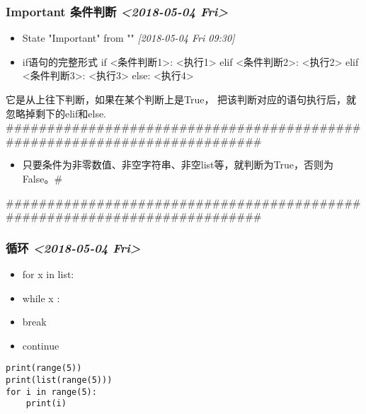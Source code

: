 \documentclass[11pt]{article}
\begin{document}
\subsubsection{{\bfseries\sffamily Important} 条件判断 \textit{<2018-05-04 Fri>}}
\label{sec:org816d645}
\begin{itemize}
\item State "Important"  from ""           \textit{[2018-05-04 Fri 09:30]}
\end{itemize}
\begin{itemize}
\item if语句的完整形式
if <条件判断1>:
    <执行1>
elif <条件判断2>:
    <执行2>
elif <条件判断3>:
    <执行3>
else:
    <执行4>
\end{itemize}
它是从上往下判断，如果在某个判断上是True，
把该判断对应的语句执行后，就忽略掉剩下的elif和else.
\#\#\#\#\#\#\#\#\#\#\#\#\#\#\#\#\#\#\#\#\#\#\#\#\#\#\#\#\#\#\#\#\#\#\#\#\#\#\#\#\#\#\#\#\#\#\#\#\#\#\#\#\#\#\#\#\#\#\#\#\#\#\#\#\#\#\#\#\#\#\#\#\#\#
\begin{itemize}
\item 只要条件为非零数值、非空字符串、非空list等，就判断为True，否则为False。\#
\end{itemize}
\#\#\#\#\#\#\#\#\#\#\#\#\#\#\#\#\#\#\#\#\#\#\#\#\#\#\#\#\#\#\#\#\#\#\#\#\#\#\#\#\#\#\#\#\#\#\#\#\#\#\#\#\#\#\#\#\#\#\#\#\#\#\#\#\#\#\#\#\#\#\#\#\#\#
\subsubsection{循环 \textit{<2018-05-04 Fri>}}
\label{sec:org860ae57}
\begin{itemize}
\item for x in list:
\item while x :
\item break
\item continue
\end{itemize}
\begin{verbatim}
print(range(5))
print(list(range(5)))
for i in range(5):
    print(i)
\end{verbatim}
\end{document}
